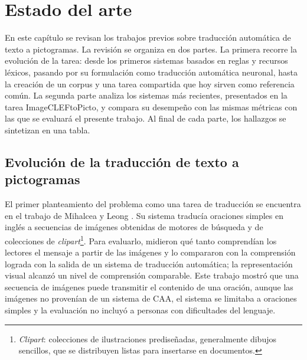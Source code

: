 \section{Estado del arte}
\label{sec:estado-arte}

En este capítulo se revisan los trabajos previos sobre traducción automática de texto a pictogramas. La revisión se organiza en dos partes. La primera recorre la evolución de la tarea: desde los primeros sistemas basados en reglas y recursos léxicos, pasando por su formulación como traducción automática neuronal, hasta la creación de un corpus y una tarea compartida que hoy sirven como referencia común. La segunda parte analiza los sistemas más recientes, presentados en la tarea ImageCLEFtoPicto, y compara su desempeño con las mismas métricas con las que se evaluará el presente trabajo. Al final de cada parte, los hallazgos se sintetizan en una tabla.

\subsection{Evolución de la traducción de texto a pictogramas}

El primer planteamiento del problema como una tarea de traducción se encuentra en el trabajo de Mihalcea y Leong \cite{mihalcea2008}. Su sistema traducía oraciones simples en inglés a secuencias de imágenes obtenidas de motores de búsqueda y de colecciones de \textit{clipart}\footnote{\textit{Clipart}: colecciones de ilustraciones prediseñadas, generalmente dibujos sencillos, que se distribuyen listas para insertarse en documentos.}. Para evaluarlo, midieron qué tanto comprendían los lectores el mensaje a partir de las imágenes y lo compararon con la comprensión lograda con la salida de un sistema de traducción automática; la representación visual alcanzó un nivel de comprensión comparable. Este trabajo mostró que una secuencia de imágenes puede transmitir el contenido de una oración, aunque las imágenes no provenían de un sistema de CAA, el sistema se limitaba a oraciones simples y la evaluación no incluyó a personas con dificultades del lenguaje.

